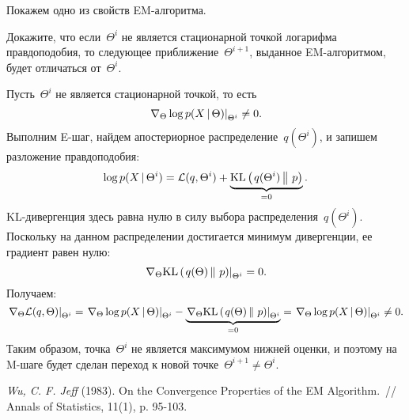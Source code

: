 \documentclass[12pt,fleqn]{article}
\begin{document}
Покажем одно из свойств EM-алгоритма.
\begin{vkProblem}
    Докажите, что если~$\Theta^i$ не является стационарной точкой
    логарифма правдоподобия, то следующее приближение~$\Theta^{i + 1}$,
    выданное EM-алгоритмом, будет отличаться от~$\Theta^i$.
\end{vkProblem}

\begin{esSolution}
    Пусть~$\Theta^i$ не является стационарной точкой,
    то есть
    \[
        \left.
        \nabla_\Theta
        \log p(X \mspace{3mu}{|}\mspace{3mu} \Theta) \right|_{\Theta^i}
        \neq 0.
    \]
    Выполним E-шаг, найдем апостериорное распределение~$q(\Theta^i)$,
    и запишем разложение правдоподобия:
    \[
        \log p(X \mspace{3mu}{|}\mspace{3mu} \Theta^i)
        =
        \mathcal{L}(q, \Theta^i)
        +
        \underbrace{\text{KL} \left(\left. {q(\Theta^i)} \mspace{3mu} \right\| \mspace{3mu} {p} \right)}_{=0}.
    \]
    KL-дивергенция здесь равна нулю в силу выбора распределения~$q(\Theta^i)$.
    Поскольку на данном распределении достигается минимум дивергенции,
    ее градиент равен нулю:
    \[
        \left.
        \nabla_\Theta \text{KL} \left(\left. {q(\Theta)} \mspace{3mu} \right\| \mspace{3mu} {p} \right) \right|_{\Theta^i}
        =
        0.
    \]
    Получаем:
    \[
        \left.
        \nabla_\Theta
            \mathcal{L}(q, \Theta) \right|_{\Theta^i}
        =
        \left.
        \nabla_\Theta
            \log p(X \mspace{3mu}{|}\mspace{3mu} \Theta) \right|_{\Theta^i}
        -
        \underbrace{\left.
        \nabla_\Theta
            \text{KL} \left(\left. {q(\Theta)} \mspace{3mu} \right\| \mspace{3mu} {p} \right) \right|_{\Theta^i}}_{=0}
        =
        \left.
        \nabla_\Theta
            \log p(X \mspace{3mu}{|}\mspace{3mu} \Theta) \right|_{\Theta^i}
        \neq
        0.
    \]
    Таким образом, точка~$\Theta^i$
    не является максимумом нижней оценки,
    и поэтому на M-шаге будет сделан переход к новой точке~$\Theta^{i + 1} \neq \Theta^i$.
\end{esSolution}

\begin{thebibliography}{1}
    \emph{Wu, C. F. Jeff} (1983).
    On the Convergence Properties of the EM Algorithm.~//
    Annals of Statistics, 11(1), p. 95-103.
\end{thebibliography}
\end{document}
